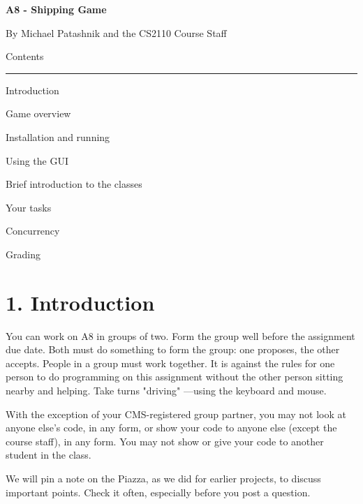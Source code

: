 \documentclass[11pt]{article}
\begin{document}
\lstset{language=Java}
\begin{center}
\begin{HUGE}{\bf A8 - Shipping Game}\\ \end{HUGE}
\vspace{3mm}
\begin{LARGE} By Michael Patashnik and the CS2110 Course Staff\\ \end{LARGE}
\vspace{7mm}
\begin{LARGE} Contents\\ \end{LARGE}
\noindent\rule{8cm}{0.4pt}
\begin{enumerate} \begin{large}
\item Introduction\item Game overview
\item Installation and running
\item Using the GUI
\item Brief introduction to the classes
\item Your tasks
\item Concurrency
\item Grading
\end{large}\end{enumerate}
\end{center}

\section{1. Introduction}
You can work on A8 in groups of two. Form the group well before the assignment due date. Both must do something to form the group:
one proposes, the other accepts.
People in a group must work together. It is against the rules for one person to do programming on this assignment
without the other person sitting nearby and helping. Take turns "driving" ---using the keyboard and mouse.

With the exception of your CMS-registered group partner, you may not look at anyone else's code, in any form,
or show your code to anyone else (except the course staff), in any form. You may not show or give your code to another
student in the class.

We will pin a note on the Piazza, as we did for earlier projects, to discuss important points. Check it often, especially before you post a question.
\end{document}
